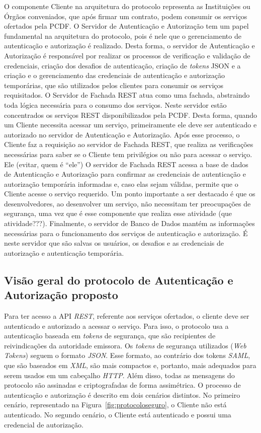 O componente Cliente na arquitetura do protocolo representa as Instituições ou Órgãos conveniados, que após firmar um contrato, podem consumir os serviços ofertados pela PCDF.
O Servidor de Autenticação e Autorização tem um papel fundamental na arquitetura do protocolo, pois é nele que o gerenciamento de autenticação e autorização é realizado. Desta forma, o servidor de Autenticação e Autorização é responsável por realizar os processos de verificação e validação de credenciais, criação dos desafios de autenticação, criação de \emph{tokens} JSON e a criação e o gerenciamento das credenciais de autenticação e autorização temporárias, que são utilizados pelos clientes para consumir os serviços requisitados.
O Servidor de Fachada REST atua como uma fachada, abstraindo toda lógica necessária para o consumo dos serviços. Neste servidor estão concentrados os serviços REST disponibilizados pela PCDF. Desta forma, quando um Cliente necessita acessar um serviço, primeiramente ele deve ser autenticado e autorizado no servidor de Autenticação e Autorização. Após esse processo, o Cliente faz a requisição ao servidor de Fachada REST, que realiza as verificações necessárias para saber se o Cliente tem privilégios ou não para acessar o serviço. {\color{red}Ele (evitar, quem \'{e} ``ele'')} O servidor de Fachada REST acessa a base de dados de Autenticação e Autorização para confirmar as credenciais de autenticação e autorização temporária informadas e, caso elas sejam válidas, permite que o Cliente acesse o serviço requerido. Um ponto importante a ser destacado é que os desenvolvedores, ao desenvolver um serviço, não necessitam ter preocupações de segurança, uma vez que é esse componente que realiza {\color{red}esse atividade (que atividade???)}. Finalmente, o servidor de Banco de Dados mant\'{e}m as informa\c c\~{o}es necess\'{a}rias   para o funcionamento dos serviços de autenticação e autorização. É neste servidor que são salvas os usuários, os desafios e as credenciais de autorização e autenticação temporária.


\subsection{Visão geral do protocolo de Autenticação e Autorização proposto}

Para ter acesso a API \emph{REST}, referente aos serviços ofertados, o cliente deve ser autenticado e autorizado a acessar o serviço. Para isso, o protocolo usa a autenticação baseada em \emph{tokens} de segurança, que são recipientes de reivindicações da autoridade emissora. Os \emph{tokens} de segurança utilizados (\emph{Web Tokens}) seguem o formato \emph{JSON}. Esse formato, ao contrário dos tokens \emph{SAML}, que são baseados em \emph{XML}, são mais compactos e, portanto, mais adequados para serem usados em um cabeçalho \emph{HTTP}. Além disso, todas as mensagens do protocolo s\~{a}o assinadas e criptografadas de forma assimétrica. O processo de autenticação e autorização é descrito em dois cenários distintos. No primeiro cenário, representado na Figura~\ref{fig:protocoloseguro}, o Cliente não está autenticado. No segundo cenário, o Cliente está autenticado e possui uma
credencial de autorização. %

